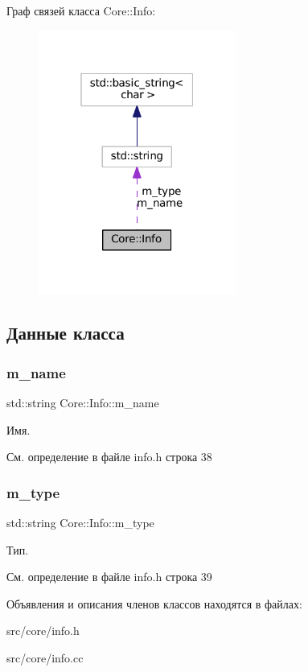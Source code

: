 Граф связей класса Core\+:\+:Info\+:
\nopagebreak
\begin{figure}[H]
\begin{center}
\leavevmode
\includegraphics[width=184pt]{class_core_1_1_info__coll__graph}
\end{center}
\end{figure}


\subsection{Данные класса}
\hypertarget{class_core_1_1_info_a027464b5db2e89c6c2f48faf99d25b22}{}\label{class_core_1_1_info_a027464b5db2e89c6c2f48faf99d25b22} 
\subsubsection{\texorpdfstring{m\+\_\+name}{m\_name}}
{\footnotesize\ttfamily std\+::string Core\+::\+Info\+::m\+\_\+name\hspace{0.3cm}{\ttfamily [private]}}

Имя. 

См. определение в файле info.\+h строка 38

\hypertarget{class_core_1_1_info_aa5d089f59122826625d6dd68af47775e}{}\label{class_core_1_1_info_aa5d089f59122826625d6dd68af47775e} 
\subsubsection{\texorpdfstring{m\+\_\+type}{m\_type}}
{\footnotesize\ttfamily std\+::string Core\+::\+Info\+::m\+\_\+type\hspace{0.3cm}{\ttfamily [private]}}

Тип. 

См. определение в файле info.\+h строка 39



Объявления и описания членов классов находятся в файлах\+:\begin{DoxyCompactItemize}
\item 
src/core/info.\+h\item 
src/core/info.\+cc\end{DoxyCompactItemize}
